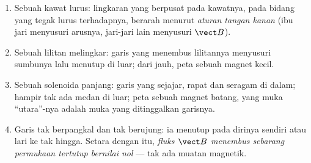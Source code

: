 \begin{proposition}\label{prop:b1:magnetostatics:maps}
\begin{enumerate}
  \item Sebuah kawat lurus: lingkaran yang berpusat pada kawatnya, pada bidang
        yang tegak lurus terhadapnya, berarah menurut \emph{aturan tangan kanan}
        (ibu jari menyusuri arusnya, jari-jari lain menyusuri $\vect B$).
  \item Sebuah lilitan melingkar: garis yang menembus lilitannya menyusuri
        sumbunya lalu menutup di luar; dari jauh, peta sebuah magnet kecil.
  \item Sebuah solenoida panjang: garis yang sejajar, rapat dan seragam di
        dalam; hampir tak ada medan di luar; peta sebuah magnet batang, yang
        muka ``utara''-nya adalah muka yang ditinggalkan garisnya.
  \item Garis  tak berpangkal dan tak berujung: ia menutup pada
        dirinya sendiri atau lari ke tak hingga. Setara dengan itu, \emph{fluks
        $\vect B$ menembus sebarang permukaan tertutup bernilai nol} --- tak ada
        muatan magnetik.
\end{enumerate}
\end{proposition}
\admitted

